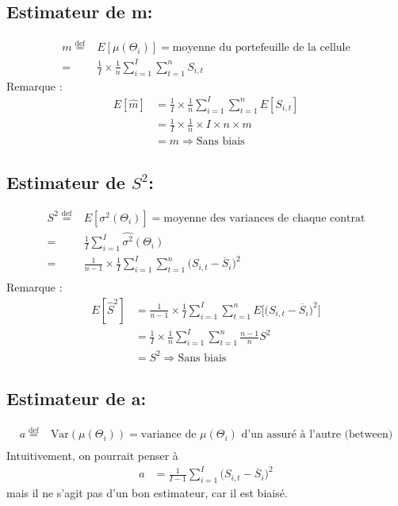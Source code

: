 \subsection{Estimateur de m:}
\begin{align*}
m \overset{\text{def}}{=}& E[\mu(\Theta_i)] = \text{moyenne du portefeuille de la cellule} \\
=& \frac{1}{I} \times \frac{1}{n} \sum_{i=1}^{I} \sum_{t=1}^{n} S_{i,t}
\end{align*}
Remarque :
\begin{align*}
E[\widehat{m}] &= \frac{1}{I} \times \frac{1}{n} \sum_{i=1}^{I} \sum_{t=1}^{n} E[S_{i,t}] \\
&= \frac{1}{I} \times \frac{1}{n} \times I \times n \times m \\
&= m \Rightarrow \text{Sans biais}
\end{align*}

\subsection{Estimateur de $S^2$:}
\begin{align*}
S^2 \overset{\text{def}}{=}& E[\sigma^2(\Theta_i)] = \text{moyenne des variances de chaque contrat} \\
=& \frac{1}{I}  \sum_{i=1}^{I} \widehat{\sigma^2}(\Theta_i) \\
=& \frac{1}{n-1} \times  \frac{1}{I}  \sum_{i=1}^{I} \sum_{t=1}^{n} \big( S_{i,t} -\overline{S}_i \big)^2 \\
\end{align*}
Remarque :
\begin{align*}
E[\widehat{S}^2] &= \frac{1}{n-1} \times  \frac{1}{I}  \sum_{i=1}^{I} \sum_{t=1}^{n} E \Big[   \big( S_{i,t} -\overline{S}_i \big)^2 \Big]\\
&= \frac{1}{I} \times \frac{1}{n}  \sum_{i=1}^{I} \sum_{t=1}^{n} \frac{n-1}{n} S^2 \\
&= S^2 \Rightarrow \text{Sans biais}
\end{align*}

\subsection{Estimateur de a:}
\begin{align*}
a \overset{\text{def}}{=}& \text{Var}(\mu(\Theta_i)) = \text{variance de $\mu(\Theta_i)$ d'un assuré à l'autre (between)} \\
\end{align*}
Intuitivement, on pourrait penser à
\begin{align*}
\widehat{a} &= \frac{1}{I-1} \sum_{i=1}^{I} \big( S_{i,t} -\overline{S}_i \big)^2
\end{align*}
mais il ne s'agit pas d'un bon estimateur, car il est biaisé.

